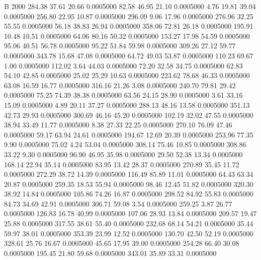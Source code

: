 


B 2000
 284.38   37.61   20.66   0.0005000
  82.58   46.95   21.10   0.0005000
   4.76   19.81   39.04   0.0005000
 256.80   22.95   10.87   0.0005000
 296.09    9.06   17.96   0.0005000
 276.96   32.25   55.55   0.0005000
  56.18   38.83   26.94   0.0005000
 358.06   72.81   26.18   0.0005000
 195.91   10.48   10.51   0.0005000
  64.06   80.16   50.32   0.0005000
 153.27   17.98   54.59   0.0005000
  95.06   40.51   56.78   0.0005000
  95.22   51.84   59.98   0.0005000
 309.26   27.12   59.77   0.0005000
 343.78   15.68   47.08   0.0005000
  64.72   49.03   53.87   0.0005000
 110.23   69.67    1.00   0.0005000
 112.02    3.64   44.03   0.0005000
  72.20   32.58   34.75   0.0005000
  62.83   54.10   42.85   0.0005000
  25.02   25.29   10.63   0.0005000
 223.62   78.68   46.33   0.0005000
  63.08   16.59   16.77   0.0005000
 316.16   21.26    3.08   0.0005000
 240.70   79.81   29.42   0.0005000
  75.25   74.39   38.38   0.0005000
  63.56   24.15   28.90   0.0005000
   3.61   33.16   15.09   0.0005000
   4.89   20.11   37.27   0.0005000
 288.13   48.16   13.58   0.0005000
 351.13   42.73   29.93   0.0005000
 300.69   46.16   45.20   0.0005000
 102.19   32.02   47.55   0.0005000
  38.94   33.49   11.77   0.0005000
   8.38   27.33   22.25   0.0005000
 270.10   76.09   47.46   0.0005000
  59.17   63.94   24.61   0.0005000
 194.67   12.69   20.39   0.0005000
 253.96   77.35    9.90   0.0005000
  75.02    4.24   53.04   0.0005000
 308.14   75.46   10.85   0.0005000
 308.86   33.22    9.30   0.0005000
  96.90   46.95   35.98   0.0005000
  29.50   52.38   13.34   0.0005000
 168.14   22.94   35.14   0.0005000
  83.95   13.42   28.37   0.0005000
 270.89   35.45   11.72   0.0005000
 272.29   38.72   14.39   0.0005000
 116.49   85.89   11.01   0.0005000
  64.43   63.34   20.87   0.0005000
 259.35   18.53   55.94   0.0005000
  98.46   12.45   51.82   0.0005000
 320.30   38.92   14.84   0.0005000
 105.86   74.26   16.87   0.0005000
 298.52   84.92   55.83   0.0005000
  84.73   34.69   42.91   0.0005000
 306.71   59.08    3.54   0.0005000
 259.25    3.87   26.77   0.0005000
 126.83   16.78   40.99   0.0005000
 107.06   28.93   13.84   0.0005000
 209.57   19.47   25.88   0.0005000
 317.55   38.61   55.40   0.0005000
 232.68   68.14   54.21   0.0005000
  35.44   59.97   38.01   0.0005000
 353.39   23.99   12.52   0.0005000
 130.70   42.50   52.19   0.0005000
 328.61   25.76   16.67   0.0005000
  45.65   17.95   39.00   0.0005000
 254.28   66.40   30.08   0.0005000
 195.45   21.80   59.68   0.0005000
 343.01   35.89   33.31   0.0005000
